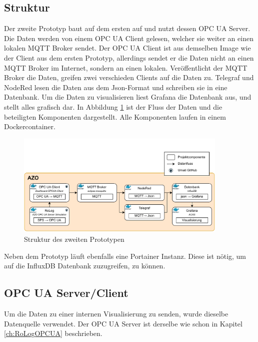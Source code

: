 \documentclass[a4paper, 12pt, oneside, toc=listofnumbered, bibliography=totoc]{scrbook}
\begin{document}
		\subsection{Struktur}
		
		Der zweite Prototyp baut auf dem ersten auf und nutzt dessen OPC UA Server. Die Daten werden von einem OPC UA Client gelesen, welcher sie weiter an einen lokalen MQTT Broker sendet. Der OPC UA Client ist aus demselben Image wie der Client aus dem ersten Prototyp, allerdings sendet er die Daten nicht an einen MQTT Broker im Internet, sondern an einen lokalen. Veröffentlicht der MQTT Broker die Daten, greifen zwei verschieden Clients auf die Daten zu. Telegraf und NodeRed lesen die Daten aus dem Json-Format und schreiben sie in eine Datenbank. Um die Daten zu visualisieren liest Grafana die Datenbank aus, und stellt alles grafisch dar. In Abbildung \ref{fig:Prototyp2} ist der Fluss der Daten und die beteiligten Komponenten dargestellt. Alle Komponenten laufen in einem Dockercontainer.
		
		\begin{figure}[H]
			\centering
			\includegraphics[width=0.9\textwidth]{res/implementierung/Prototyp-Prototyp.pdf}
			\caption{Struktur des zweiten Prototypen}
			\label{fig:Prototyp2}
		\end{figure}
		
		Neben dem Prototyp läuft ebenfalls eine Portainer Instanz. Diese ist nötig, um auf die InfluxDB Datenbank zuzugreifen, zu können. 
		
		\subsection{OPC UA Server/Client}
		
		Um die Daten zu einer internen Visualisierung zu senden, wurde dieselbe Datenquelle verwendet. Der OPC UA Server ist derselbe wie schon in Kapitel \ref{ch:RoLogOPCUA} beschrieben. 
		
\end{document}
